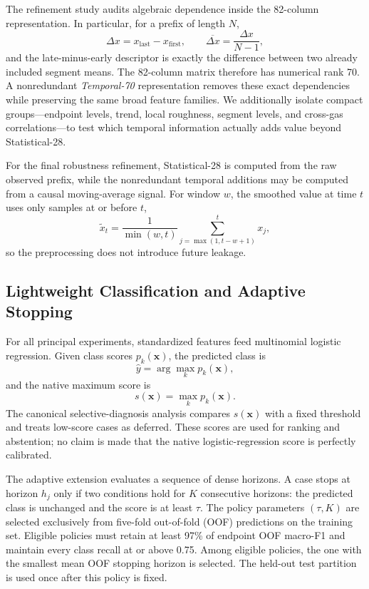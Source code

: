 \documentclass[conference]{IEEEtran}
\begin{document}
The refinement study audits algebraic dependence inside the 82-column representation. In particular, for a prefix of length $N$,
\begin{equation}
\Delta x=x_{\mathrm{last}}-x_{\mathrm{first}},\qquad
\overline{\Delta x}=\frac{\Delta x}{N-1},
\end{equation}
and the late-minus-early descriptor is exactly the difference between two already included segment means. The 82-column matrix therefore has numerical rank 70. A nonredundant \emph{Temporal-70} representation removes these exact dependencies while preserving the same broad feature families. We additionally isolate compact groups---endpoint levels, trend, local roughness, segment levels, and cross-gas correlations---to test which temporal information actually adds value beyond Statistical-28.

For the final robustness refinement, Statistical-28 is computed from the raw observed prefix, while the nonredundant temporal additions may be computed from a causal moving-average signal. For window $w$, the smoothed value at time $t$ uses only samples at or before $t$,
\begin{equation}
\tilde{x}_t=\frac{1}{\min(w,t)}\sum_{j=\max(1,t-w+1)}^{t}x_j,
\end{equation}
so the preprocessing does not introduce future leakage.

\subsection{Lightweight Classification and Adaptive Stopping}
For all principal experiments, standardized features feed multinomial logistic regression. Given class scores $p_k(\mathbf{x})$, the predicted class is
\begin{equation}
\hat{y}=\arg\max_k p_k(\mathbf{x}),
\end{equation}
and the native maximum score is
\begin{equation}
s(\mathbf{x})=\max_k p_k(\mathbf{x}).
\end{equation}
The canonical selective-diagnosis analysis compares $s(\mathbf{x})$ with a fixed threshold and treats low-score cases as deferred. These scores are used for ranking and abstention; no claim is made that the native logistic-regression score is perfectly calibrated.

The adaptive extension evaluates a sequence of dense horizons. A case stops at horizon $h_j$ only if two conditions hold for $K$ consecutive horizons: the predicted class is unchanged and the score is at least $\tau$. The policy parameters $(\tau,K)$ are selected exclusively from five-fold out-of-fold (OOF) predictions on the training set. Eligible policies must retain at least 97\% of endpoint OOF macro-F1 and maintain every class recall at or above 0.75. Among eligible policies, the one with the smallest mean OOF stopping horizon is selected. The held-out test partition is used once after this policy is fixed.
\end{document}
